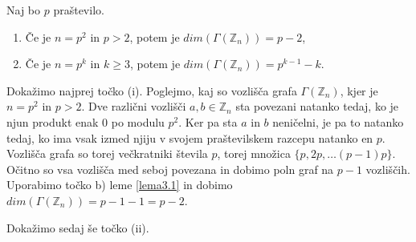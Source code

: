 \documentclass[mat1, tisk]{fmfdelo}
\newcommand{\Z}{\mathbb Z}
\begin{document}
%
\begin{trditev}
  Naj bo $p$ praštevilo.
  \begin{enumerate}[label=(\roman*)]
      \item Če je $n = p^2$ in $p > 2$, potem je $dim(\Gamma(\Z_{n})) = p - 2$,
      \item Če je $n = p^k$ in $k \geq 3$, potem je $dim(\Gamma(\Z_{n})) = p^{k-1} - k$.
  \end{enumerate}
\end{trditev}
\begin{dokaz}
  Dokažimo najprej točko (i).
  Poglejmo, kaj so vozlišča grafa $\Gamma(\Z_{n})$, kjer je $n = p^2$ in $p > 2$. Dve 
  različni vozlišči $a, b \in \Z_{n}$ sta povezani natanko tedaj, ko je njun produkt enak $0$ po modulu 
  $p^2$. Ker pa sta $a$ in $b$ neničelni, je pa to natanko tedaj, ko ima vsak izmed njiju v svojem praštevilskem 
  razcepu natanko en $p$. Vozlišča grafa so torej večkratniki števila $p$, torej množica $\{p,2p,  \ldots (p-1)p\}$.
  Očitno so vsa vozlišča med seboj povezana in dobimo poln graf na $p-1$ vozliščih. Uporabimo točko b)
  leme \ref{lema3.1} in dobimo $dim(\Gamma(\Z_{n})) = p - 1 - 1 = p - 2$.

  Dokažimo sedaj še točko (ii).
  
\end{dokaz}
\end{document}
